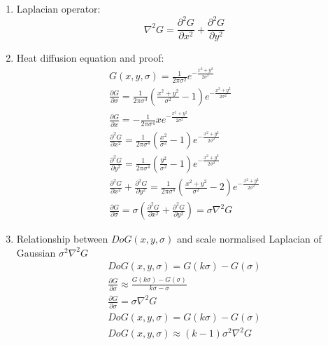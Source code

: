 \documentclass[9pt]{article}
\begin{document}
\begin{multicols*}{2}
\begin{enumerate}
            \item Laplacian operator:
            $$
                \nabla^2 G = \frac{\partial ^2 G}{\partial x^2} + \frac{\partial^2 G}{\partial y^2}
            $$

            \item Heat diffusion equation and proof:
            {\setlength{\mathindent}{0cm}}
            \begin{gather*}
                G(x,y,\sigma) = \frac{1}{2 \pi \sigma^2} e^{-\frac{x^2 + y^2}{2\sigma^2}} \\
                \frac{\partial G}{\partial \sigma} = \frac{1}{2\pi \sigma^3}\left(\frac{x^2+y^2}{\sigma^2} - 1\right)e^{-\frac{x^2+y^2}{2\sigma^2}} \\
                \frac{\partial G}{\partial x} = -\frac{1}{2\pi \sigma^4} x e^{-\frac{x^2+y^2}{2\sigma^2}} \\ 
                \frac{\partial^2 G}{\partial x^2} = \frac{1}{2\pi \sigma^4} \left(\frac{x^2}{\sigma^2} - 1\right)e^{-\frac{x^2+y^2}{2\sigma^2}} \\ 
                \frac{\partial^2 G}{\partial y^2} = \frac{1}{2\pi \sigma^4} \left(\frac{y^2}{\sigma^2} - 1\right)e^{-\frac{x^2+y^2}{2\sigma^2}} \\
                \frac{\partial^2 G}{\partial x^2} + \frac{\partial^2 G}{\partial y^2} = \frac{1}{2\pi \sigma^4} \left(\frac{x^2 + y^2}{\sigma^2} - 2\right) e^{-\frac{x^2+y^2}{2\sigma^2}} \\
                \frac{\partial G}{\partial \sigma} = \sigma \left(\frac{\partial^2 G}{\partial x^2} + \frac{\partial^2 G}{\partial y^2} \right) = \sigma \nabla^2 G
            \end{gather*}

            \item Relationship between $DoG(x,y,\sigma)$ and scale normalised Laplacian of Gaussian $\sigma^2 \nabla^2 G$
            {\setlength{\mathindent}{0cm}}
            \begin{gather*}
                DoG(x,y,\sigma) = G(k\sigma) - G(\sigma) \\ 
                \frac{\partial G}{\partial \sigma} \approx \frac{G(k\sigma) - G(\sigma)}{k\sigma - \sigma} \\
                \frac{\partial G}{\partial \sigma} = \sigma \nabla^2 G \\ 
                DoG(x,y,\sigma) = G(k\sigma) - G(\sigma) \\ 
                DoG(x,y,\sigma) \approx (k-1)\sigma^2\nabla^2G
            \end{gather*}


\end{enumerate}
\end{multicols*}
\end{document}
